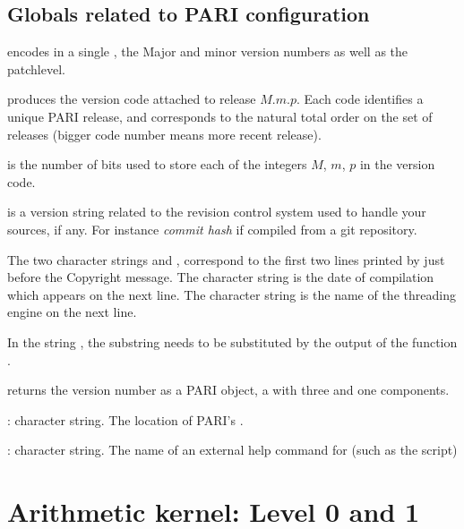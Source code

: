 \section{Globals related to PARI configuration}

\noindent {} encodes in a single , the Major
and minor version numbers as well as the patchlevel.

 produces the version code
attached to release $M.m.p$. Each code identifies a unique PARI release,
and corresponds to the natural total order on the set of releases (bigger
code number means more recent release).

\noindent {} is the number of bits used to store each of
the integers $M$, $m$, $p$ in the version code.

\noindent {} is a version string related to the
revision control system used to handle your sources, if any. For instance
\emph{commit hash} if compiled from a git repository.

The two character strings  and ,
correspond to the first two lines printed by  just before the
Copyright message. The character string  is the
date of compilation which appears on the next line. The character string
 is the name of the threading engine on the next line.

In the string , the substring  needs
to be substituted by the output of the function .


 returns the version number as a PARI object, a
 with three  and one  components.


: character string. The location of PARI's .

: character string. The name of an external help command
for  (such as the  script)

\newpage
\chapter{Arithmetic kernel: Level 0 and 1}

